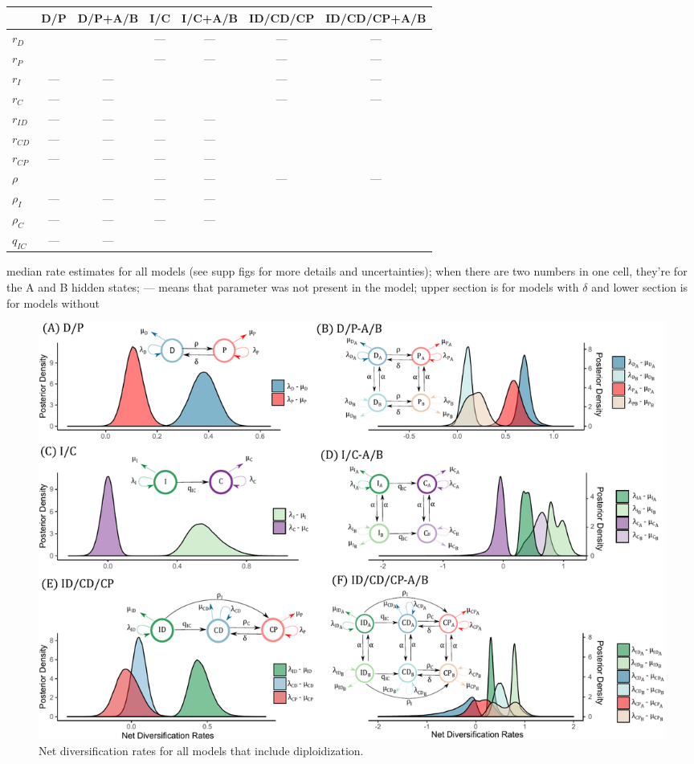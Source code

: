 \begin{supptable}
\begin{center}
    \vspace{12pt}
    \begin{tabular}{lcccccc}
                       & D/P & D/P+A/B & I/C & I/C+A/B & ID/CD/CP & ID/CD/CP+A/B \\ \midrule
        $r_D$          &     &         & --- & ---     & ---      & ---          \\
        $r_P$          &     &         & --- & ---     & ---      & ---          \\
        $r_I$          & --- & ---     &     &         & ---      & ---          \\
        $r_C$          & --- & ---     &     &         & ---      & ---          \\
        $r_{ID}$       & --- & ---     & --- & ---     &          &              \\
        $r_{CD}$       & --- & ---     & --- & ---     &          &              \\
        $r_{CP}$       & --- & ---     & --- & ---     &          &              \\
        $\rho$         &     &         & --- & ---     & ---      & ---          \\
        $\rho_I$       & --- & ---     & --- & ---     &          &              \\
        $\rho_C$       & --- & ---     & --- & ---     &          &              \\
        $q_{IC}$       & --- & ---     &     &         &          &              
    \end{tabular}
    \end{center}
    \caption{median rate estimates for all models (see supp figs for more details and uncertainties); when there are two numbers in one cell, they're for the A and B hidden states; --- means that parameter was not present in the model; upper section is for models with $\delta$ and lower section is for models without}
    \label{table:estimates}
\end{supptable}

\begin{figure}
\includegraphics[width=\textwidth]{Netdiversificationallmodels.pdf}
  \caption{Net diversification rates for all models that include diploidization.}  
\label{figure:netdivall}
\end{figure}

